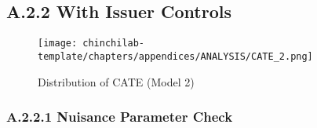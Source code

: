 \subsection{A.2.2 With Issuer Controls}

\begin{figure}[H]
    \centering
    \texttt{[image: chinchilab-template/chapters/appendices/ANALYSIS/CATE\_2.png]}
    \caption{Distribution of CATE (Model 2)}
    \label{fig:my_label}
\end{figure}


\subsubsection{A.2.2.1 Nuisance Parameter Check}

